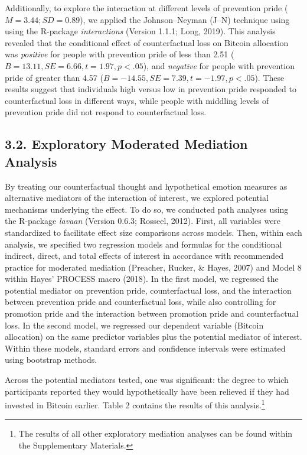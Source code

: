 \documentclass[man,floatsintext]{apa6}
\let\rmarkdownfootnote\footnote%
\def\footnote{\protect\rmarkdownfootnote}
\begin{document}
Additionally, to explore the interaction at different levels of prevention pride (\(M = 3.44; SD = 0.89\)), we applied the Johnson--Neyman (J--N) technique using using the R-package \emph{interactions} (Version 1.1.1; Long, 2019). This analysis revealed that the conditional effect of counterfactual loss on Bitcoin allocation was \emph{positive} for people with prevention pride of less than 2.51 (\(B = 13.11, SE = 6.66, t = 1.97, p < .05\)), and \emph{negative} for people with prevention pride of greater than 4.57 (\(B = -14.55, SE = 7.39, t = -1.97, p < .05\)). These results suggest that individuals high versus low in prevention pride responded to counterfactual loss in different ways, while people with middling levels of prevention pride did not respond to counterfactual loss.

\hypertarget{exploratory-moderated-mediation-analysis}{%
\subsection{3.2. Exploratory Moderated Mediation Analysis}\label{exploratory-moderated-mediation-analysis}}

By treating our counterfactual thought and hypothetical emotion measures as alternative mediators of the interaction of interest, we explored potential mechanisms underlying the effect. To do so, we conducted path analyses using the R-package \emph{lavaan} (Version 0.6.3; Rosseel, 2012). First, all variables were standardized to facilitate effect size comparisons across models. Then, within each analysis, we specified two regression models and formulas for the conditional indirect, direct, and total effects of interest in accordance with recommended practice for moderated mediation (Preacher, Rucker, \& Hayes, 2007) and Model 8 within Hayes' PROCESS macro (2018). In the first model, we regressed the potential mediator on prevention pride, counterfactual loss, and the interaction between prevention pride and counterfactual loss, while also controlling for promotion pride and the interaction between promotion pride and counterfactual loss. In the second model, we regressed our dependent variable (Bitcoin allocation) on the same predictor variables plus the potential mediator of interest. Within these models, standard errors and confidence intervals were estimated using bootstrap methods.

Across the potential mediators tested, one was significant: the degree to which participants reported they would hypothetically have been relieved if they had invested in Bitcoin earlier. Table 2 contains the results of this analysis.\footnote{The results of all other exploratory mediation analyses can be found within the Supplementary Materials.}
\end{document}

